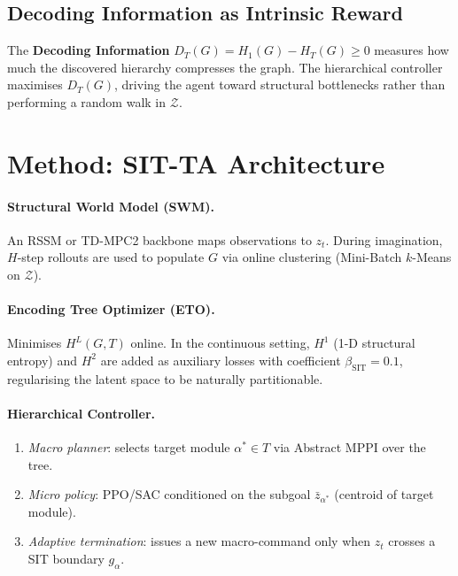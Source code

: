 \documentclass[10pt,twocolumn]{article}
\begin{document}
\subsection{Decoding Information as Intrinsic Reward}
The \textbf{Decoding Information}
$D_T(G)=H_1(G)-H_T(G)\ge 0$
measures how much the discovered hierarchy compresses the graph.
The hierarchical controller maximises $D_T(G)$, driving the agent toward
structural bottlenecks rather than performing a random walk in
$\mathcal{Z}$.

\section{Method: SIT-TA Architecture}

\paragraph{Structural World Model (SWM).}
An RSSM or TD-MPC2 backbone maps observations to $z_t$.  During
imagination, $H$-step rollouts are used to populate $G$ via online
clustering (Mini-Batch $k$-Means on $\mathcal{Z}$).

\paragraph{Encoding Tree Optimizer (ETO).}
Minimises $H^L(G,T)$ online.  In the continuous setting, $H^1$
(1-D structural entropy) and $H^2$ are added as auxiliary losses with
coefficient $\beta_{\mathrm{SIT}}=0.1$, regularising the latent space to be
naturally partitionable.

\paragraph{Hierarchical Controller.}
\begin{enumerate}
  \item \emph{Macro planner}: selects target module $\alpha^*\!\in\!T$ via
    Abstract MPPI over the tree.
  \item \emph{Micro policy}: PPO/SAC conditioned on the subgoal
    $\bar{z}_{\alpha^*}$ (centroid of target module).
  \item \emph{Adaptive termination}: issues a new macro-command only when
    $z_t$ crosses a SIT boundary $g_\alpha$.
\end{enumerate}
\end{document}
